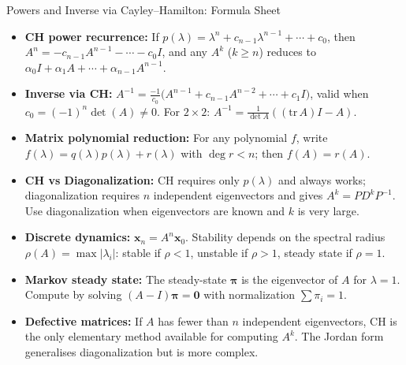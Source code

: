 \documentclass[12pt,a4paper]{article}
\begin{document}
\begin{learnbox}{Powers and Inverse via Cayley--Hamilton: Formula Sheet}
\begin{itemize}
  \item \textbf{CH power recurrence:} If \(p(\lambda) = \lambda^n + c_{n-1}\lambda^{n-1}+\cdots+c_0\), then \(A^n = -c_{n-1}A^{n-1} - \cdots - c_0 I\), and any \(A^k\) (\(k \geq n\)) reduces to \(\alpha_0 I + \alpha_1 A + \cdots + \alpha_{n-1}A^{n-1}\).

  \item \textbf{Inverse via CH:} \(\displaystyle A^{-1} = \frac{-1}{c_0}\bigl(A^{n-1} + c_{n-1}A^{n-2} + \cdots + c_1 I\bigr)\), valid when \(c_0 = (-1)^n\det(A) \neq 0\). For \(2\times2\): \(A^{-1} = \tfrac{1}{\det A}((\mathrm{tr}\,A)I - A)\).

  \item \textbf{Matrix polynomial reduction:} For any polynomial \(f\), write \(f(\lambda) = q(\lambda)p(\lambda) + r(\lambda)\) with \(\deg r < n\); then \(f(A) = r(A)\).

  \item \textbf{CH vs Diagonalization:} CH requires only \(p(\lambda)\) and always works; diagonalization requires \(n\) independent eigenvectors and gives \(A^k = PD^kP^{-1}\). Use diagonalization when eigenvectors are known and \(k\) is very large.

  \item \textbf{Discrete dynamics:} \(\mathbf{x}_n = A^n\mathbf{x}_0\). Stability depends on the spectral radius \(\rho(A) = \max|\lambda_i|\): stable if \(\rho < 1\), unstable if \(\rho > 1\), steady state if \(\rho = 1\).

  \item \textbf{Markov steady state:} The steady-state \(\boldsymbol{\pi}\) is the eigenvector of \(A\) for \(\lambda = 1\). Compute by solving \((A - I)\boldsymbol{\pi} = \mathbf{0}\) with normalization \(\sum \pi_i = 1\).

  \item \textbf{Defective matrices:} If \(A\) has fewer than \(n\) independent eigenvectors, CH is the only elementary method available for computing \(A^k\). The Jordan form generalises diagonalization but is more complex.
\end{itemize}
\end{learnbox}
\end{document}
